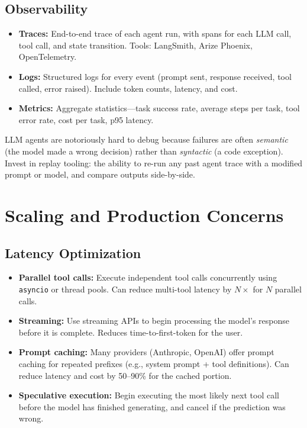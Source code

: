 \subsection{Observability}
\label{observability}

\begin{keybox}
\begin{itemize}
  \item \textbf{Traces:} End-to-end trace of each agent run, with spans for each LLM call, tool call, and state transition. Tools: LangSmith, Arize Phoenix, OpenTelemetry.
  \item \textbf{Logs:} Structured logs for every event (prompt sent, response received, tool called, error raised). Include token counts, latency, and cost.
  \item \textbf{Metrics:} Aggregate statistics---task success rate, average steps per task, tool error rate, cost per task, p95 latency.
\end{itemize}
\end{keybox}

\begin{warningbox}
LLM agents are notoriously hard to debug because failures are often \emph{semantic} (the model made a wrong decision) rather than \emph{syntactic} (a code exception). Invest in replay tooling: the ability to re-run any past agent trace with a modified prompt or model, and compare outputs side-by-side.
\end{warningbox}

\section{Scaling and Production Concerns}
\label{scaling-and-production-concerns}

\subsection{Latency Optimization}
\label{latency-optimization}

\begin{itemize}
  \item \textbf{Parallel tool calls:} Execute independent tool calls concurrently using \texttt{asyncio} or thread pools. Can reduce multi-tool latency by $N\times$ for $N$ parallel calls.
  \item \textbf{Streaming:} Use streaming APIs to begin processing the model’s response before it is complete. Reduces time-to-first-token for the user.
  \item \textbf{Prompt caching:} Many providers (Anthropic, OpenAI) offer prompt caching for repeated prefixes (e.g., system prompt + tool definitions). Can reduce latency and cost by 50--90\% for the cached portion.
  \item \textbf{Speculative execution:} Begin executing the most likely next tool call before the model has finished generating, and cancel if the prediction was wrong.
\end{itemize}

